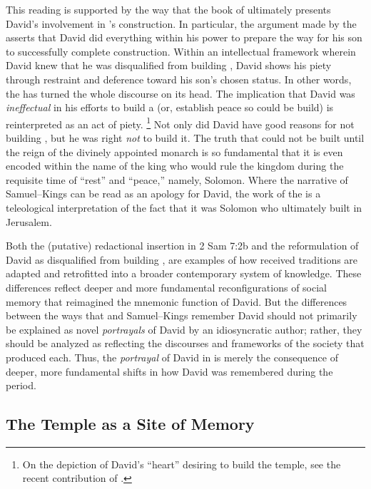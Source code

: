 This reading is supported by the way that the book of \chronicles ultimately presents David's involvement in \thetemple's construction. In particular, the argument made by the \chronicler asserts that David did everything within his power to prepare the way for his son to successfully complete construction. Within an intellectual framework wherein David knew that he was disqualified from building \thetemple, David shows his piety through restraint and deference toward his son's chosen status. In other words, the \chronicler has turned the whole discourse on its head. The implication that David was \emph{ineffectual} in his efforts to build a \temple (or, establish peace so \thetemple could be build) is reinterpreted as an act of piety.%
    \footnote{On the depiction of David's ``heart'' desiring to build the temple, see the recent contribution of \cite{cudworth_cbq2019}.}
Not only did David have good reasons for not building \thetemple, but he was right \emph{not} to build it. The truth that \thetemple could not be built until the reign of the divinely appointed monarch is so fundamental that it is even encoded within the name of the king who would rule the kingdom during the requisite time of ``rest'' and ``peace,'' namely, Solomon. Where the narrative of Samuel--Kings can be read as an apology for David, the work of the \chronicler is a teleological interpretation of the fact that it was Solomon who ultimately built \thetemple in Jerusalem.

Both the (putative) redactional insertion in 2 Sam 7:2b and the reformulation of David as disqualified from building \thetemple, are examples of how received traditions are adapted and retrofitted into a broader contemporary system of knowledge. These differences reflect deeper and more fundamental reconfigurations of social memory that reimagined the mnemonic function of David. But the differences between the ways that \chronicles and Samuel--Kings remember David should not primarily be explained as novel \emph{portrayals} of David by an idiosyncratic author; rather, they should be analyzed as reflecting the discourses and frameworks of the society that produced each. Thus, the \emph{portrayal} of David in \chronicles is merely the consequence of deeper, more fundamental shifts in how David was remembered during the \secondtemple period. 

\subsection{The Temple as a Site of Memory}

